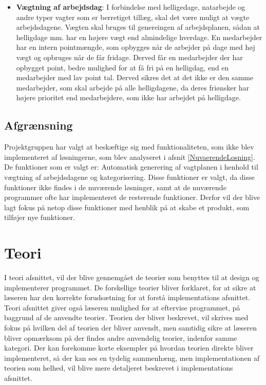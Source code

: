 \begin{itemize}
    \item \textbf{Vægtning af arbejdsdag}: I forbindelse med helligedage, natarbejde og andre typer vagter som er berretiget tillæg, skal det være muligt at vægte arbejdsdagene. Vægten skal bruges til genereingen af arbejdsplanen, sådan at helligdage mm. har en højere vægt end almindelige hverdage. En medarbejder har en intern pointmængde, som opbygges når de arbejder på dage med høj vægt og opbruges når de får fridage. Derved får en medarbejder der har opbygget point, bedre mulighed for at få fri på en helligdag, end en medarbejder med lav point tal. Derved sikres det at det ikke er den samme medarbejder, som skal arbejde på alle helligdagene, da deres friønsker har højere prioritet end medarbejdere, som ikke har arbejdet på helligdage.
\end{itemize}

\subsection{Afgrænsning}
Projektgruppen har valgt at beskæftige sig med funktionaliteten, som ikke blev implementeret af løsningerne, som blev analyseret i afsnit \ref{NuvaerendeLosning}. De funktioner som er valgt er: Automatisk generering af vagtplanen i henhold til vægtning af arbejdsdagene og kategorisering. Disse funktioner er valgt, da disse funktioner ikke findes i de nuværende løsninger, samt at de nuværende programmer ofte har implementeret de resterende funktioner. Derfor vil der blive lagt fokus på netop disse funktioner med henblik på at skabe et produkt, som tilføjer nye funktioner.

\section{Teori}
I teori afsnittet, vil der blive gennemgået de teorier som benyttes til at design og implementerer programmet. De forskellige teorier bliver forklaret, for at sikre at læseren har den korrekte forudsætning for at forstå implementations afsnittet. Teori afsnittet giver også læseren mulighed for at eftervise programmet, på baggrund af de anvendte teorier. Teorien der bliver beskrevet, vil skrives med fokus på hvilken del af teorien der bliver anvendt, men samtidig sikre at læseren bliver opmærksom på der findes andre anvendelig teorier, indenfor samme kategori. Der kan forekomme korte eksempler på hvordan teorien direkte bliver implementeret, så der kan ses en tydelig sammenhæng, men implementationen af teorien som helhed, vil blive mere detaljeret beskrevet i implementations afsnittet. 

